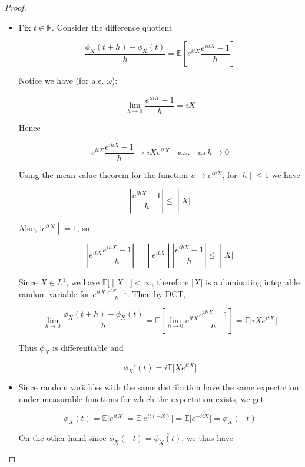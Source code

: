 \documentclass{qlnotes-export}
\begin{document}
\begin{proof}

\begin{itemize}
\item
  Fix \(t \in {\mathbb{R}}\). Consider the difference quotient

  \[\frac{\phi_{X}(t + h) - \phi_{X}(t)}{h} = {\mathbb{E}}\left\lbrack {e^{itX}\frac{e^{ihX} - 1}{h}} \right\rbrack\]

  Notice we have (for a.e. \(\omega\)):

  \[\lim\limits_{h\rightarrow 0}\frac{e^{ihX} - 1}{h} = iX\]

  Hence

  \[e^{itX}\frac{e^{ihX} - 1}{h}\rightarrow iXe^{itX}\quad\text{a.s.}\quad\text{as}\ h\rightarrow 0\]

  Using the mean value theorem for the function \(u\mapsto e^{iuX}\), for \(\left. |h \middle| \leq 1 \right.\) we have

  \[\left. \left| \frac{e^{ihX} - 1}{h} \right| \leq \middle| X| \right.\]

  Also, \(\left. |e^{itX} \middle| = 1 \right.\), so

  \[\left. \left| {e^{itX}\frac{e^{ihX} - 1}{h}} \right| = \middle| e^{itX} \middle| \left| \frac{e^{ihX} - 1}{h} \right| \leq \middle| X| \right.\]

  Since \(X \in L^{1}\), we have \(\left. {\mathbb{E}}\lbrack \middle| X \middle| \rbrack < \infty \right.\), therefore \(|X|\) is a dominating integrable random variable for \(e^{itX}\frac{e^{ihX} - 1}{h}\). Then by DCT,

  \[\lim\limits_{h\rightarrow 0}\frac{\phi_{X}(t + h) - \phi_{X}(t)}{h} = {\mathbb{E}}\left\lbrack {\lim\limits_{h\rightarrow 0}e^{itX}\frac{e^{ihX} - 1}{h}} \right\rbrack = {\mathbb{E}}\lbrack iXe^{itX}\rbrack\]

  Thus \(\phi_{X}\) is differentiable and

  \[\phi_{X}'(t) = i{\mathbb{E}}\lbrack Xe^{itX}\rbrack\]
\item
  Since random variables with the same distribution have the same expectation under measurable functions for which the expectation exists, we get

  \[\phi_{X}(t) = {\mathbb{E}}\lbrack e^{itX}\rbrack = {\mathbb{E}}\lbrack e^{it( - X)}\rbrack = {\mathbb{E}}\lbrack e^{- itX}\rbrack = \phi_{X}( - t)\]

  On the other hand since \(\phi_{X}( - t) = \bar{\phi_{X}(t)}\), we thus have


\end{itemize}
\end{proof}
\end{document}
